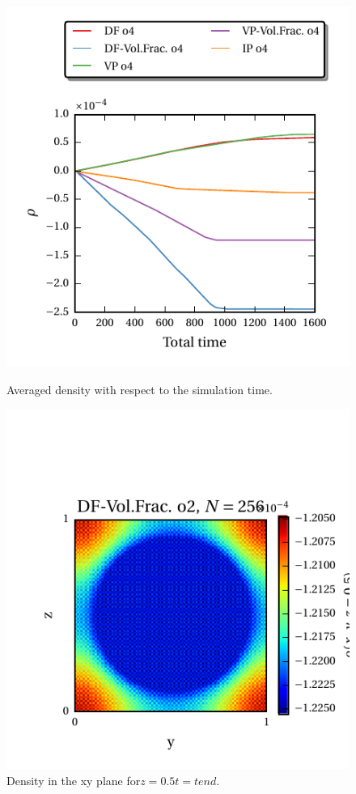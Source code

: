 \begin{figure}[tp]
  \begin{minipage}[c]{0.5\textwidth}
      \includegraphics{gfx/immersed_boundary/hpflow/long/ts.pdf}
      \caption{\label{hpflow:results_long_ts}
            Averaged density with respect to the simulation time.
          }
  \end{minipage}
  \begin{minipage}[c]{0.5\textwidth}
      \includegraphics{gfx/immersed_boundary/hpflow/long/example.pdf}
      \caption{\label{hpflow:results_long_example}
        Density in the xy plane for$ z = 0.5 t = tend$.
      }
  \end{minipage}
\end{figure}

